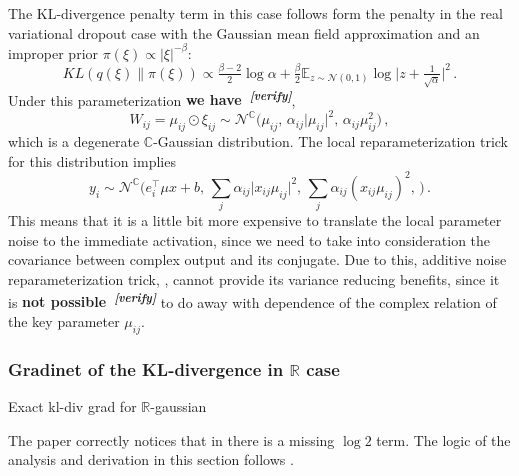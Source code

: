 \documentclass[a4paper,10pt]{article}
\newcommand{\attn}[2]{\textbf{\color{red} #2~\textsuperscript{\textit{[#1]}}}}
\newcommand{\verify}[1]{\attn{verify}{#1}}
\newcommand{\real}{\mathbb{R}}
\newcommand{\cplx}{\mathbb{C}}
\begin{document}
The KL-divergence penalty term in this case follows form the penalty in the real variational
dropout case with the Gaussian mean field approximation and an improper prior $
  \pi(\xi)\propto \lvert \xi \rvert^{-\beta}
$:
$$
KL(q(\xi)\| \pi(\xi))
  \propto \tfrac{\beta-2}2 \log \alpha
    + \tfrac\beta2 \mathbb{E}_{z\sim \mathcal{N}(0, 1)}
      \log \lvert z + \tfrac1{\sqrt{\alpha}} \rvert^2
  \,. $$
Under this parameterization \verify{we have},
$$
W_{ij} = \mu_{ij} \odot \xi_{ij}
  \sim \mathcal{N}^{\cplx} \bigl(
    \mu_{ij},
    \, \alpha_{ij} \lvert \mu_{ij} \rvert^2,
    \, \alpha_{ij} \mu_{ij}^2
  \bigr)
  \,, $$
which is a degenerate $\cplx$-Gaussian distribution. The local reparameterization trick for
this distribution implies
$$
y_i
  \sim \mathcal{N}^{\cplx}\bigl(
    e_i^\top \mu x + b,
    \, \sum_j \alpha_{ij} \lvert x_{ij} \mu_{ij}\rvert^2,
    \, \sum_j \alpha_{ij} (x_{ij} \mu_{ij})^2,
    \,
  \bigr)
  \,. $$
This means that it is a little bit more expensive to translate the local parameter noise
to the immediate activation, since we need to take into consideration the covariance between
complex output and its conjugate. Due to this, additive noise reparameterization trick,
\cite{molchanov_variational_2017}, cannot provide its variance reducing benefits, since
it is \verify{not possible} to do away with dependence of the complex relation of the
key parameter $\mu_{ij}$.



\subsubsection{Gradinet of the KL-divergence in $\real$ case} %
\label{ssub:gradinet_of_the_kl_divergence_in_R_case}

Exact kl-div grad for $\mathbb{R}$-gaussian

The paper \cite{pav_moments_2015} correctly notices that in \cite[p. 2466]{lapidoth_capacity_2003}
there is a missing $\log{2}$ term. The logic of the analysis and derivation in this section
follows \cite{lapidoth_capacity_2003}.
\end{document}
